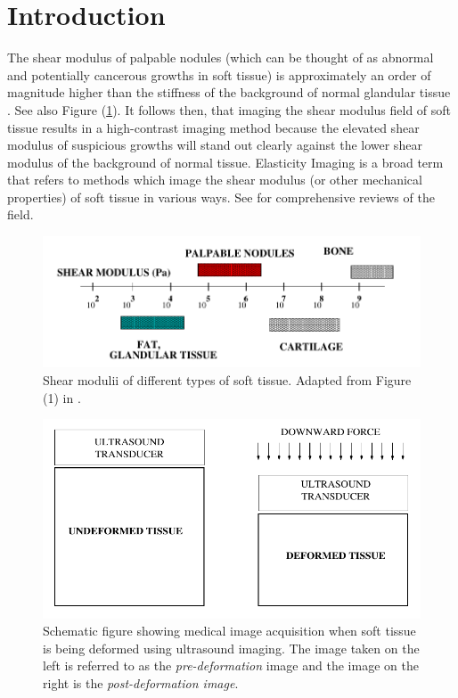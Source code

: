 \documentclass[12pt]{article}
\begin{document}
\section{Introduction}
The shear modulus of palpable nodules (which can be thought of as abnormal and potentially cancerous growths in soft tissue) is approximately an order of magnitude higher than the stiffness of the background of normal glandular tissue \cite{paper:sarv1998}. See also Figure (\ref{fig:shearmod}). It follows then, that imaging the shear modulus field of soft tissue results in a high-contrast imaging method because the elevated shear modulus of suspicious growths will stand out clearly against the lower shear modulus of the background of normal tissue. Elasticity Imaging is a broad term that refers to methods which image the shear modulus (or other mechanical properties) of soft tissue in various ways. See \cite{paper:gao1996,paper:parker2010,book:alamgarra2019,bookchap:oberaibarbone2019} for comprehensive reviews of the field.
%
\begin{figure}[h]
   \centering
    \includegraphics[totalheight=3cm]{Figures/shearmod.png}
  \caption{\label{fig:shearmod} Shear modulii of different types of soft tissue. Adapted from Figure (1) in \cite{paper:sarv1998}.}
\end{figure}
%
\begin{figure}[h]
   \centering
    \includegraphics[totalheight=5cm]{Figures/prepostimage.png}
  \caption{\label{fig:prepostimage} Schematic figure showing medical image acquisition when soft tissue is being deformed using ultrasound imaging. The image taken on the left is referred to as the \textit{pre-deformation} image and the image on the right is the \textit{post-deformation image}.}
\end{figure}
%
\end{document}
